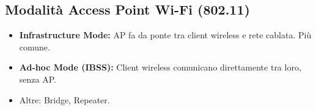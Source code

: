 \subsection{Modalità Access Point Wi-Fi (802.11)}
\begin{itemize}
    \item \textbf{Infrastructure Mode:} AP fa da ponte tra client wireless e rete cablata. Più comune.
    \item \textbf{Ad-hoc Mode (IBSS):} Client wireless comunicano direttamente tra loro, senza AP.
    \item Altre: Bridge, Repeater.
\end{itemize}

